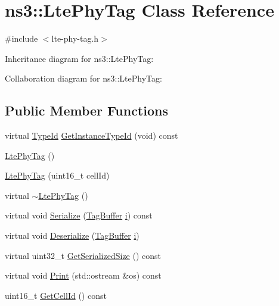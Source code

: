 \hypertarget{classns3_1_1LtePhyTag}{}\section{ns3\+:\+:Lte\+Phy\+Tag Class Reference}
\label{classns3_1_1LtePhyTag}


{\ttfamily \#include $<$lte-\/phy-\/tag.\+h$>$}



Inheritance diagram for ns3\+:\+:Lte\+Phy\+Tag\+:


Collaboration diagram for ns3\+:\+:Lte\+Phy\+Tag\+:
\subsection*{Public Member Functions}
\begin{DoxyCompactItemize}
\item 
virtual \hyperlink{classns3_1_1TypeId}{Type\+Id} \hyperlink{classns3_1_1LtePhyTag_a7788c0e63753cdf218a69ebfed0d76f4}{Get\+Instance\+Type\+Id} (void) const 
\item 
\hyperlink{classns3_1_1LtePhyTag_a96468a29e1c8f8656a8cea0c94e63537}{Lte\+Phy\+Tag} ()
\item 
\hyperlink{classns3_1_1LtePhyTag_a4a7c03ae6367b09dc56e4548c02f758b}{Lte\+Phy\+Tag} (uint16\+\_\+t cell\+Id)
\item 
virtual \hyperlink{classns3_1_1LtePhyTag_ad2bd2b0b28536dda9aaebcfc8c93284e}{$\sim$\+Lte\+Phy\+Tag} ()
\item 
virtual void \hyperlink{classns3_1_1LtePhyTag_aca99e0e411ac636fc85ce2a7ad7dae91}{Serialize} (\hyperlink{classns3_1_1TagBuffer}{Tag\+Buffer} \hyperlink{lte__uplink__power__control_8m_a6f6ccfcf58b31cb6412107d9d5281426}{i}) const 
\item 
virtual void \hyperlink{classns3_1_1LtePhyTag_af1dcc2003e4d725097bfa0217af8f134}{Deserialize} (\hyperlink{classns3_1_1TagBuffer}{Tag\+Buffer} \hyperlink{lte__uplink__power__control_8m_a6f6ccfcf58b31cb6412107d9d5281426}{i})
\item 
virtual uint32\+\_\+t \hyperlink{classns3_1_1LtePhyTag_a9639f00f08a3de8f91c52e4bd3816726}{Get\+Serialized\+Size} () const 
\item 
virtual void \hyperlink{classns3_1_1LtePhyTag_afba073aadbce3e2a3375fd4190720674}{Print} (std\+::ostream \&os) const 
\item 
uint16\+\_\+t \hyperlink{classns3_1_1LtePhyTag_ac1a968caafc0db7e1b2cd914ab790bb2}{Get\+Cell\+Id} () const 
\end{DoxyCompactItemize}
